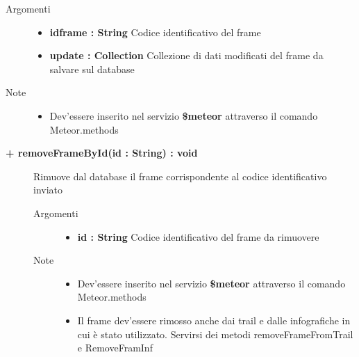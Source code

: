 \begin{description}
\begin{description}
		\begin{description}
			\item[Argomenti] \hfill
				\begin{itemize}
				
					\item \textbf{idframe : String			} \hfill
					Codice identificativo del frame
					\item \textbf{update : Collection		} \hfill
					Collezione di dati modificati del frame da salvare sul database
					
				\end{itemize}
			\item[Note] \hfill
			\begin{itemize}
					\item Dev'essere inserito nel servizio \textbf{\$meteor} attraverso il comando Meteor.methods
				\end{itemize}
		\end{description}
	\end{description}
	
	\begin{description}
		\item[\textbf{\color{blue}+ removeFrameById(id : String) : void			}] \hfill
			Rimuove dal database il frame corrispondente al codice identificativo inviato
			
		\begin{description}
			\item[Argomenti] \hfill
				\begin{itemize}
				
					\item \textbf{id : String			} \hfill
					Codice identificativo del frame da rimuovere
					
				\end{itemize}
			\item[Note] \hfill
			\begin{itemize}
					\item Dev'essere inserito nel servizio \textbf{\$meteor} attraverso il comando Meteor.methods
					\item Il frame dev'essere rimosso anche dai trail e dalle infografiche in cui è stato utilizzato. Servirsi dei metodi removeFrameFromTrail e RemoveFramInf
				\end{itemize}
		\end{description}
	\end{description}
	

\end{description}
